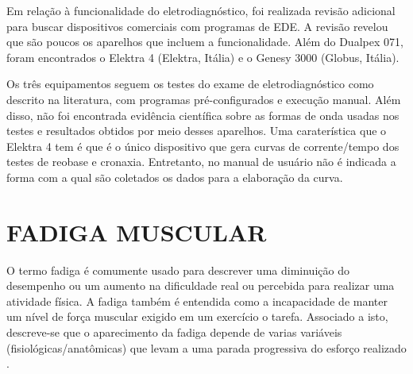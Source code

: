 Em relação à funcionalidade do eletrodiagnóstico, foi realizada revisão adicional para buscar dispositivos comerciais com programas de \acrshort{EDE}. A revisão revelou que são poucos os aparelhos que incluem a funcionalidade. Além do Dualpex 071, foram encontrados o Elektra 4 (Elektra, Itália) e o Genesy 3000 (Globus, Itália).

Os três equipamentos seguem os testes do exame de eletrodiagnóstico como descrito na literatura, com programas pré-configurados e execução manual. Além disso, não foi encontrada evidência científica sobre as formas de onda usadas nos testes e resultados obtidos por meio desses aparelhos.
Uma caraterística que o Elektra 4 tem é que é o único dispositivo que gera curvas de corrente/tempo dos testes de reobase e cronaxia. Entretanto, no manual de usuário não é indicada a forma com a qual são coletados os dados para a elaboração da curva.



\section{FADIGA MUSCULAR}




O termo fadiga é comumente usado para descrever uma diminuição do desempenho ou um aumento na dificuldade real ou percebida para realizar uma atividade física. A fadiga também é entendida como a incapacidade de manter um nível de força muscular exigido em um exercício o tarefa. Associado a isto, descreve-se que o aparecimento da fadiga depende de varias variáveis (fisiológicas/anatômicas) que levam a uma parada progressiva do esforço realizado \cite{ArceRodriguez2015}.

